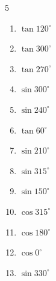 \begin{multicols}{5}
\begin{enumerate}
  \item $\displaystyle \tan{120^\circ}$


  \item $\displaystyle \tan{300^\circ}$


  \item $\displaystyle \tan{270^\circ}$

        \phantom{$\displaystyle なし$}

  \item $\displaystyle \sin{300^\circ}$


  \item $\displaystyle \sin{240^\circ}$


  \item $\displaystyle \tan{60^\circ}$


  \item $\displaystyle \sin{210^\circ}$


  \item $\displaystyle \sin{315^\circ}$


  \item $\displaystyle \sin{150^\circ}$


  \item $\displaystyle \cos{315^\circ}$


  \item $\displaystyle \cos{180^\circ}$

        \phantom{$\displaystyle =-1$}

  \item $\displaystyle \cos{0^\circ}$

        \phantom{$\displaystyle =1$}

  \item $\displaystyle \sin{330^\circ}$


\end{enumerate}
\end{multicols}
